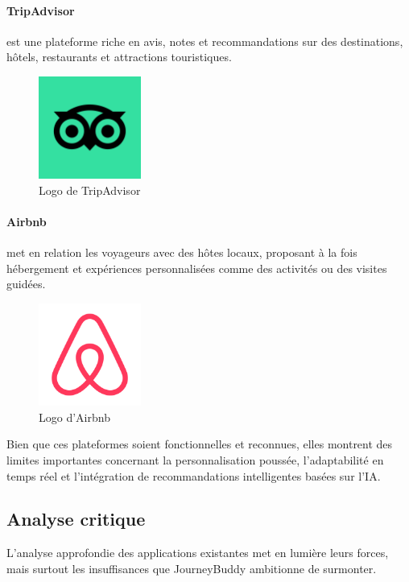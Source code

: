 \paragraph{TripAdvisor} est une plateforme riche en avis, notes et recommandations sur des destinations, hôtels, restaurants et attractions touristiques.

\begin{figure}[H]
\centering
\includegraphics[width=0.3\textwidth]{logos/tripadvisor.png}
\caption{Logo de TripAdvisor}
\end{figure}

\paragraph{Airbnb} met en relation les voyageurs avec des hôtes locaux, proposant à la fois hébergement et expériences personnalisées comme des activités ou des visites guidées.

\begin{figure}[H]
\centering
\includegraphics[width=0.3\textwidth]{logos/airbnb.png}
\caption{Logo d'Airbnb}
\end{figure}

Bien que ces plateformes soient fonctionnelles et reconnues, elles montrent des limites importantes concernant la personnalisation poussée, l'adaptabilité en temps réel et l’intégration de recommandations intelligentes basées sur l’IA.

\subsection{Analyse critique}

L’analyse approfondie des applications existantes met en lumière leurs forces, mais surtout les insuffisances que JourneyBuddy ambitionne de surmonter.

